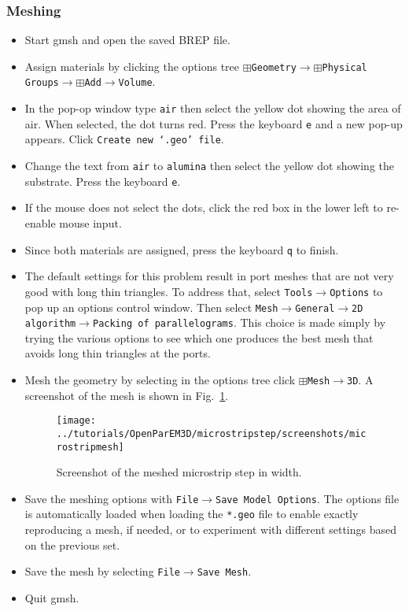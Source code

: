 \documentclass[titlepage]{article}
\renewcommand\_{\textunderscore\linebreak[1]}
\begin{document}
\subsubsection{Meshing}
\begin{itemize}
\item Start gmsh and open the saved BREP file.
\item Assign materials by clicking the options tree $\boxplus$\texttt{Geometry}$\rightarrow$$\boxplus$\texttt{Physical Groups}$\rightarrow$$\boxplus$\texttt{Add}$\rightarrow$\texttt{Volume}.
\item In the pop-op window type \texttt{air} then select the yellow dot showing the area of air.  When selected, the dot turns red.  Press the keyboard \texttt{e} and a new pop-up appears.  Click \texttt{Create new `.geo' file}.
\item Change the text from \texttt{air} to \texttt{alumina} then select the yellow dot showing the substrate.  Press the keyboard \texttt{e}.
\item If the mouse does not select the dots, click the red box in the lower left to re-enable mouse input.
\item Since both materials are assigned, press the keyboard \texttt{q} to finish.
\item The default settings for this problem result in port meshes that are not very good with long thin triangles.  To address that, select \texttt{Tools}$\rightarrow$\texttt{Options} to pop up an options control window. Then select \texttt{Mesh}$\rightarrow$\texttt{General}$\rightarrow$\texttt{2D algorithm}$\rightarrow$\texttt{Packing of parallelograms}.  This choice is made simply by trying the various options to see which one produces the best mesh that avoids long thin triangles at the ports.
\item Mesh the geometry by selecting in the options tree click $\boxplus$\texttt{Mesh}$\rightarrow$\texttt{3D}. A screenshot of the mesh is shown in Fig.~\ref{fig:microstrip_mesh}.
\begin{figure}
  \centering
  \texttt{[image: ../tutorials/OpenParEM3D/microstrip\_step/screenshots/microstrip\_mesh]}
  \caption{Screenshot of the meshed microstrip step in width.}
  \label{fig:microstrip_mesh}
\end{figure}
\item Save the meshing options with \texttt{File}$\rightarrow$\texttt{Save Model Options}.  The options file is automatically loaded when loading the \texttt{*.geo} file to enable exactly reproducing a mesh, if needed, or to experiment with different settings based on the previous set.
\item Save the mesh by selecting \texttt{File}$\rightarrow$\texttt{Save Mesh}.
\item Quit gmsh.
\end{itemize}
\end{document}
